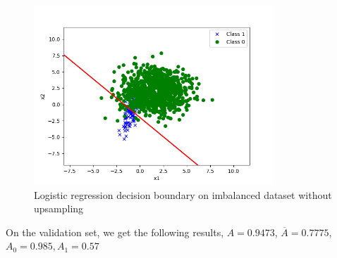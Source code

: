 
\begin{answer}
\begin{figure}[H]
    \centering
    \includegraphics[width=9cm]{imbalanced/naive.png}
    \caption*{Logistic regression decision boundary on imbalanced dataset without upsampling}
\end{figure}
On the validation set, we get the following results, $A = 0.9473$, $\overline{A} = 0.7775$, $A_0 = 0.985, A_1 = 0.57$
\end{answer}